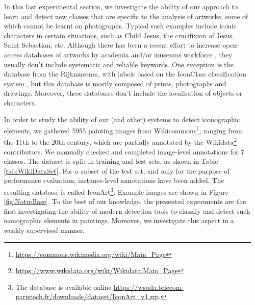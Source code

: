 \documentclass[runningheads]{llncs}
\newcommand\NB{IconArt} \newcommand\MIL{MI-max}
\begin{document}
In this last experimental section, we investigate the ability of our approach to learn and detect new classes that are specific to the analysis of artworks, some of which cannot be learnt on photographs. Typical such examples include iconic characters in certain situations, such as Child Jesus, the crucifixion of Jesus, Saint Sebastian, etc.
Although there has been a recent effort to increase open-access  databases of artworks by academia and/or museums workforce \cite{mensink_rijksmuseum_2014,crowley_search_2014,lecoutre_recognizing_2017,mao_deepart_2017,strezoski_omniart_2017,rijksmuseum_online_2018,europeana_collections_2018,met_image_2018}, they usually don't include systematic and reliable keywords. One exception is  the database from the Rijkmuseum, with labels based on the IconClass classification system \cite{iconclass_home_2018}, but this database is mostly composed of prints, photographs and drawings. Moreover, these databases don't include the localisation of objects or characters. 

In order to study the ability of our (and other) systems to detect iconographic elements, we gathered 5955 painting images from Wikicommons\footnote{\url{https://commons.wikimedia.org/wiki/Main_Page}}, ranging from the 11th to the 20th century, which are partially annotated by the Wikidata\footnote{\url{https://www.wikidata.org/wiki/Wikidata:Main_Page}} contributors. We manually checked and completed image-level annotations for 7 classes. The dataset is split in training and test sets, as shown in Table \ref{tab:WikiDataSet}.
For a subset of the test set, and only for the purpose of performance evaluation,  instance-level annotations have been added. The resulting database is called \NB{}\footnote{The database is available online \url{https://wsoda.telecom-paristech.fr/downloads/dataset/IconArt_v1.zip}.}. Example images are shown in Figure  \ref{fig:NotreBase}. To the best of our knowledge, the presented experiments are the first investigating the ability of modern detection tools to classify and detect such iconographic elements in paintings. Moreover, we investigate this aspect in a weakly supervised manner.

\begin{table}
    \centering
    \caption{Statistics of the IconArt database}
    \label{tab:WikiDataSet}
    
\end{table}
\end{document}
